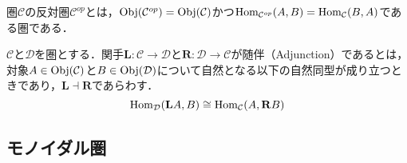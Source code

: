 \documentclass[type_judgement.tex]{subfiles}
\begin{document}
\begin{defn}[Category（圏）]
\begin{defn}
圏$\mathcal{C}$の反対圏$\mathcal{C}^{op}$とは，$\mathop{\mathrm{Obj}}\nolimits(\mathcal{C}^{op}) = \mathop{\mathrm{Obj}}\nolimits(\mathcal{C})$かつ$\mathop{\mathrm{Hom}}\nolimits_{\mathcal{C}^{op}}(A,B) = \mathop{\mathrm{Hom}}\nolimits_\mathcal{C}(B,A)$である圏である．
\end{defn}

\begin{defn}
  $\mathcal{C}$と$\mathcal{D}$を圏とする．関手$\mathbf{L}:\mathcal{C} \rightarrow \mathcal{D}$と$\mathbf{R}:\mathcal{D} \rightarrow \mathcal{C}$が随伴（Adjunction）であるとは，
  対象$A\in\mathop{\mathrm{Obj}}\nolimits(\mathcal{C})$と$B\in\mathop{\mathrm{Obj}}\nolimits(\mathcal{D})$について自然となる以下の自然同型が成り立つときであり，$\mathbf{L}\dashv\mathbf{R}$であらわす．
  \begin{equation*}
    \mathop{\mathrm{Hom}}\nolimits_\mathcal{D}(\mathbf{L}A, B) \cong \mathop{\mathrm{Hom}}\nolimits_\mathcal{C}(A, \mathbf{R}B)
  \end{equation*}
  \begin{center}
  \end{center}
\end{defn}

\subsection{モノイダル圏}
\end{defn}
\end{document}
